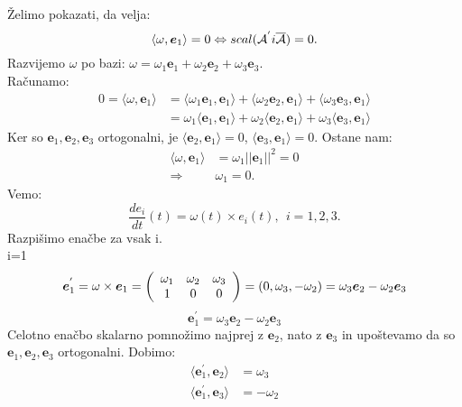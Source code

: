 \documentclass[mat1]{fmfdelo}
\newcommand{\e}{\boldsymbol e}
\newcommand{\A}{\mathcal A}
\begin{document}
\begin{dokaz}
Želimo pokazati, da velja:
\begin{equation}
\langle \omega,\e_1\rangle = 0 \Leftrightarrow scal(\A^{'} \\i\overline{\A}) = 0.
\end{equation}
Razvijemo $\omega$ po bazi: $\omega = \omega_1\e_1+\omega_2\e_2+\omega_3\e_3$. \\
Računamo:
\begin{equation*}
\begin{split}
0 = \langle \omega, \e_1 \rangle &= \langle \omega_1\e_1,\e_1\rangle + \langle \omega_2\e_2,\e_1\rangle + \langle \omega_3\e_3,\e_1\rangle \\
&= \omega_1\langle \e_1,\e_1\rangle + \omega_2\langle \e_2,\e_1\rangle + \omega_3\langle \e_3,\e_1\rangle
\end{split}
\end{equation*}
Ker so $\e_1,\e_2,\e_3$ ortogonalni, je  $\langle \e_2,\e_1\rangle = 0$, $\langle \e_3,\e_1\rangle=0$.
Ostane nam:
\begin{equation*}
\begin{split}
\langle \omega,\e_1 \rangle &=\omega_1 || \e_1 ||^2 = 0 \\
\Rightarrow ~~ & \omega_1 = 0.
\end{split}
\end{equation*}
Vemo:
\begin{equation*}
\frac{de_i}{dt}(t) = \omega(t) \times e_i(t), ~~ i=1,2,3.
\end{equation*}
Razpišimo enačbe za vsak i.\\
i=1
\begin{equation*}
\e_1^{'} = \omega \times \e_1 = \left(
\begin{array}{c c c}
\omega_1 & \omega_2 & \omega_3 \\
1 & 0 & 0
\end{array} \right)
= (0, \omega_3,-\omega_2) = \omega_3\e_2 - \omega_2\e_3
\end{equation*}
\begin{equation*}
\e_1^{'} = \omega_3\e_2-\omega_2\e_3
\end{equation*}
Celotno enačbo skalarno pomnožimo najprej z $\e_2$, nato z $\e_3$ in upoštevamo da so $\e_1,\e_2,\e_3$ ortogonalni. Dobimo:
\begin{equation*}
\begin{split}
\langle \e_1^{'}, \e_2 \rangle & = \omega_3 \\
\langle \e_1^{'}, \e_3 \rangle &= -\omega_2
\end{split}
\end{equation*}


\end{dokaz}
\end{document}
